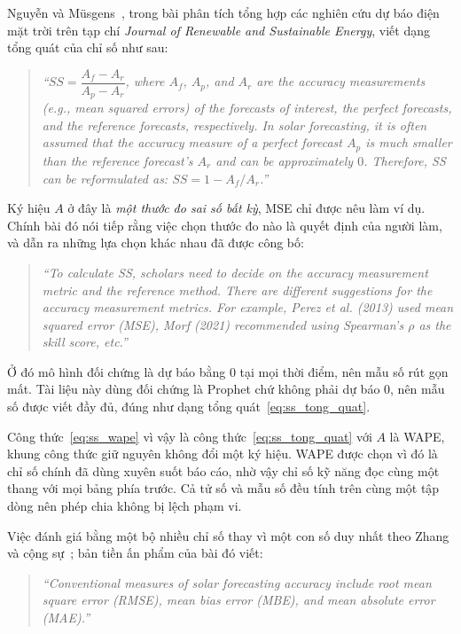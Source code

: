 \documentclass[12pt, a4paper]{report}
\begin{document}
Nguyễn và Müsgens~\cite{nguyen2026meta}, trong bài phân tích tổng hợp các nghiên cứu dự báo điện
mặt trời trên tạp chí \textit{Journal of Renewable and Sustainable Energy}, viết dạng tổng quát
của chỉ số như sau:

\begin{quote}\small
\textit{``$SS = \dfrac{A_f - A_r}{A_p - A_r}$, where $A_f$, $A_p$, and $A_r$ are the accuracy
measurements (e.g., mean squared errors) of the forecasts of interest, the perfect forecasts, and
the reference forecasts, respectively. In solar forecasting, it is often assumed that the accuracy
measure of a perfect forecast $A_p$ is much smaller than the reference forecast's $A_r$ and can be
approximately $0$. Therefore, SS can be reformulated as: $SS = 1 - A_f/A_r$.''}
\end{quote}

Ký hiệu $A$ ở đây là \textit{một thước đo sai số bất kỳ}, MSE chỉ được nêu làm ví dụ. Chính bài
đó nói tiếp rằng việc chọn thước đo nào là quyết định của người làm, và dẫn ra những lựa chọn
khác nhau đã được công bố:

\begin{quote}\small
\textit{``To calculate SS, scholars need to decide on the accuracy measurement metric and the
reference method. There are different suggestions for the accuracy measurement metrics. For
example, Perez et al. (2013) used mean squared error (MSE), Morf (2021) recommended using
Spearman's $\rho$ as the skill score, etc.''}
\end{quote}


Ở đó mô hình đối chứng là dự báo bằng $0$ tại mọi thời điểm, nên mẫu số rút gọn mất. Tài liệu này
dùng đối chứng là Prophet chứ không phải dự báo $0$, nên mẫu số được viết đầy đủ, đúng như dạng
tổng quát~\eqref{eq:ss_tong_quat}.

Công thức~\eqref{eq:ss_wape} vì vậy là công thức~\eqref{eq:ss_tong_quat} với $A$ là WAPE, khung
công thức giữ nguyên không đổi một ký hiệu. WAPE được chọn vì đó là chỉ số chính đã dùng xuyên
suốt báo cáo, nhờ vậy chỉ số kỹ năng đọc cùng một thang với mọi bảng phía trước. Cả tử số và mẫu
số đều tính trên cùng một tập dòng nên phép chia không bị lệch phạm vi.

Việc đánh giá bằng một bộ nhiều chỉ số thay vì một con số duy nhất theo Zhang và cộng
sự~\cite{zhang2015metrics}; bản tiền ấn phẩm của bài đó viết:

\begin{quote}\small
\textit{``Conventional measures of solar forecasting accuracy include root mean square error
(RMSE), mean bias error (MBE), and mean absolute error (MAE).''}
\end{quote}
\end{document}
